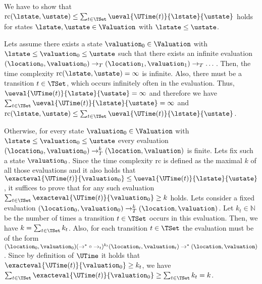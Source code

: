 We have to show that $\text{rc}(\lstate, \ustate) \leq \sum_{t \in \TSet} \ueval{\UTime(t)}{\lstate}{\ustate}$ holds for states $\lstate, \ustate \in \Valuation$ with $\lstate \leq \ustate$.

Lets assume there exists a state $\valuation_0 \in \Valuation$ with $\lstate \leq \valuation_0 \leq \ustate$ such that there exists an infinite evaluation $(\location_0, \valuation_0) \rightarrow_T (\location_1, \valuation_1) \rightarrow_T \dots$.
Then, the time complexity $\text{rc}(\lstate, \ustate) = \infty$ is infinite.
Also, there must be a transition $t \in \TSet$, which occurs infinitely often in the evaluation.
Thus, $\ueval{\UTime(t)}{\lstate}{\ustate} = \infty$ and therefore we have $\sum_{t \in \TSet} \ueval{\UTime(t)}{\lstate}{\ustate} = \infty$ and $\text{rc}(\lstate, \ustate) \leq \sum_{t \in \TSet} \ueval{\UTime(t)}{\lstate}{\ustate}$.

Otherwise, for every state $\valuation_0 \in \Valuation$ with $\lstate \leq \valuation_0 \leq \ustate$ every evaluation $(\location_0, \valuation_0) \rightarrow^k_T (\location, \valuation)$ is finite.
Lets fix such a state $\valuation_0$.
Since the time complexity $\text{rc}$ is defined as the maximal $k$ of all those evaluations and it also holds that $\exacteval{\UTime(t)}{\valuation_0} \leq \ueval{\UTime(t)}{\lstate}{\ustate}$, it suffices to prove that for any such evaluation $\sum_{t \in \TSet} \exacteval{\UTime(t)}{\valuation_0} \geq k$ holds.
Lets consider a fixed evaluation $(\location_0, \valuation_0) \rightarrow^k_T (\location, \valuation)$.
Let $k_t \in \mathbb{N}$ be the number of times a transition $t \in \TSet$ occurs in this evaluation.
Then, we have $k = \sum_{t \in \TSet} k_t$.
Also, for each transition $t \in \TSet$ the evaluation must be of the form $(\location_0, \valuation_0) (\rightarrow^* \circ \rightarrow_t)^{k_t} (\location_t, \valuation_t) \rightarrow^* (\location, \valuation)$.
Since by definition of $\UTime$ it holds that $\exacteval{\UTime(t)}{\valuation_0} \geq k_t$, we have $\sum_{t \in \TSet} \exacteval{\UTime(t)}{\valuation_0} \geq \sum_{t \in \TSet} k_t = k$.
